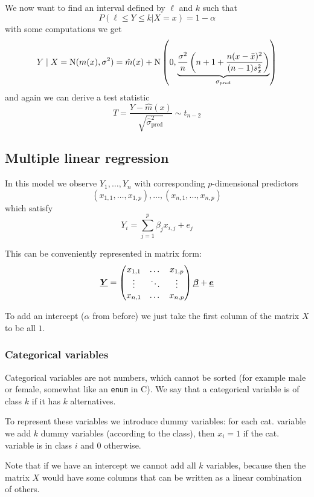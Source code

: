 \documentclass[12pt]{extarticle}
\newcommand{\Normal}{{\operatorfont N}}
\renewcommand{\vec}[1]{\uvec{#1}}
\begin{document}
We now want to find an interval defined by $\ell$ and $k$ such that
\begin{equation}
    P(\ell \leq Y \leq k | X = x) = 1-\alpha
\end{equation}
with some computations we get
\begin{equation}
    Y \mid X = \Normal(m(x), \sigma^2) = \hat m(x) + \Normal\left(0, \underbrace{\frac{\sigma^2}{n}\left(n+1+ \frac{n(x-\bar x)^2}{(n-1)s^2_x}\right)}_{\sigma_\text{pred}} \right)
\end{equation}
and again we can derive a test statistic
\begin{equation}
    T = \frac{Y - \hat m(x)}{\sqrt{\hat \sigma^2_\text{pred}}} \sim t_{n-2}
\end{equation}

\subsection{Multiple linear regression}
In this model we observe $Y_1, \dots, Y_n$ with corresponding $p$-dimensional predictors
\begin{equation}
    (x_{1,1}, \dots, x_{1,p}), \dots, (x_{n, 1}, \dots, x_{n,p})
\end{equation}
which satisfy
\begin{equation}
    Y_i = \sum_{j = 1}^p \beta_j x_{i, j}+ e_j
\end{equation}

This can be conveniently represented in matrix form:
\begin{equation}
    \vec Y = \begin{pmatrix}
        x_{1, 1} & \dots  & x_{1, p} \\
        \vdots   & \ddots & \vdots   \\
        x_{n, 1} & \dots  & x_{n, p}
    \end{pmatrix} \vec \beta + \vec e
\end{equation}

To add an intercept ($\alpha$ from before) we just take the first column of the matrix $X$ to be all $1$.

\subsubsection{Categorical variables}
Categorical variables are not numbers, which cannot be sorted (for example male or female, somewhat like an \texttt{enum} in C).
We say that a categorical variable is of class $k$ if it has $k$ alternatives.

To represent these variables we introduce dummy variables:
for each cat. variable we add $k$ dummy variables (according to the class),
then $x_i = 1$ if the cat. variable is in class $i$ and $0$ otherwise.

Note that if we have an intercept we cannot add all $k$ variables, because then the matrix $X$
would have some columns that can be written as a linear combination of others.
\end{document}
